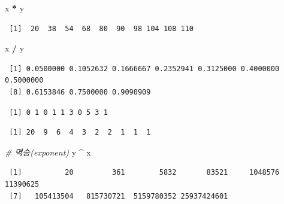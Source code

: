 \documentclass[
  11pt,
]{krantz}
\newenvironment{Shaded}{\begin{snugshade}}{\end{snugshade}}
\newcommand{\CommentTok}[1]{\textcolor[rgb]{0.37,0.37,0.37}{\textit{#1}}}
\newcommand{\NormalTok}[1]{#1}
\newcommand{\OperatorTok}[1]{\textcolor[rgb]{0.43,0.43,0.43}{\textbf{#1}}}
\newcommand{\StringTok}[1]{\textcolor[rgb]{0.5,0.5,0.5}{#1}}
\begin{document}
\begin{Shaded}
\begin{Highlighting}[]
\NormalTok{x }\OperatorTok{*}\StringTok{ }\NormalTok{y}
\end{Highlighting}
\end{Shaded}

\begin{verbatim}
 [1]  20  38  54  68  80  90  98 104 108 110
\end{verbatim}

\begin{Shaded}
\begin{Highlighting}[]
\NormalTok{x }\OperatorTok{/}\StringTok{ }\NormalTok{y}
\end{Highlighting}
\end{Shaded}

\begin{verbatim}
 [1] 0.0500000 0.1052632 0.1666667 0.2352941 0.3125000 0.4000000 0.5000000
 [8] 0.6153846 0.7500000 0.9090909
\end{verbatim}

\begin{Shaded}
\end{Shaded}

\begin{verbatim}
 [1] 0 1 0 1 1 3 0 5 3 1
\end{verbatim}

\begin{Shaded}
\end{Shaded}

\begin{verbatim}
 [1] 20  9  6  4  3  2  2  1  1  1
\end{verbatim}

\begin{Shaded}
\begin{Highlighting}[]
\CommentTok{# 멱승(exponent)}
\NormalTok{y }\OperatorTok{^}\StringTok{ }\NormalTok{x}
\end{Highlighting}
\end{Shaded}

\begin{verbatim}
 [1]          20         361        5832       83521     1048576    11390625
 [7]   105413504   815730721  5159780352 25937424601
\end{verbatim}
\end{document}
